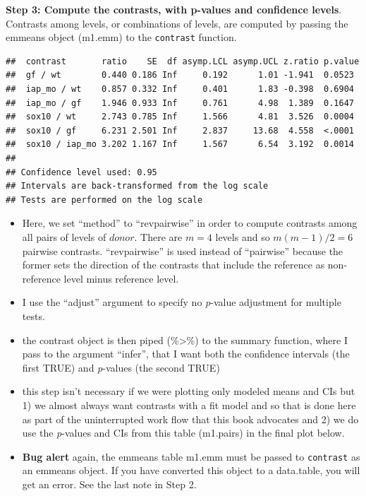 \documentclass[]{book}
\newenvironment{Shaded}{\begin{snugshade}}{\end{snugshade}}
\newcommand{\DataTypeTok}[1]{\textcolor[rgb]{0.13,0.29,0.53}{#1}}
\newcommand{\KeywordTok}[1]{\textcolor[rgb]{0.13,0.29,0.53}{\textbf{#1}}}
\newcommand{\NormalTok}[1]{#1}
\newcommand{\OperatorTok}[1]{\textcolor[rgb]{0.81,0.36,0.00}{\textbf{#1}}}
\newcommand{\OtherTok}[1]{\textcolor[rgb]{0.56,0.35,0.01}{#1}}
\newcommand{\StringTok}[1]{\textcolor[rgb]{0.31,0.60,0.02}{#1}}
\providecommand{\tightlist}{%
  \setlength{\itemsep}{0pt}\setlength{\parskip}{0pt}}
\begin{document}
\textbf{Step 3: Compute the contrasts, with p-values and confidence levels}. Contrasts among levels, or combinations of levels, are computed by passing the emmeans object (m1.emm) to the \texttt{contrast} function.

\begin{Shaded}
\end{Shaded}

\begin{verbatim}
##  contrast       ratio    SE  df asymp.LCL asymp.UCL z.ratio p.value
##  gf / wt        0.440 0.186 Inf     0.192      1.01 -1.941  0.0523 
##  iap_mo / wt    0.857 0.332 Inf     0.401      1.83 -0.398  0.6904 
##  iap_mo / gf    1.946 0.933 Inf     0.761      4.98  1.389  0.1647 
##  sox10 / wt     2.743 0.785 Inf     1.566      4.81  3.526  0.0004 
##  sox10 / gf     6.231 2.501 Inf     2.837     13.68  4.558  <.0001 
##  sox10 / iap_mo 3.202 1.167 Inf     1.567      6.54  3.192  0.0014 
## 
## Confidence level used: 0.95 
## Intervals are back-transformed from the log scale 
## Tests are performed on the log scale
\end{verbatim}

\begin{itemize}
\tightlist
\item
  Here, we set ``method'' to ``revpairwise'' in order to compute contrasts among all pairs of levels of \(donor\). There are \(m = 4\) levels and so \(m(m-1)/2 = 6\) pairwise contrasts. ``revpairwise'' is used instead of ``pairwise'' because the former sets the direction of the contrasts that include the reference as non-reference level minus reference level.
\item
  I use the ``adjust'' argument to specify no \emph{p}-value adjustment for multiple tests.
\item
  the contrast object is then piped (\%\textgreater\%) to the summary function, where I pass to the argument ``infer'', that I want both the confidence intervals (the first TRUE) and \emph{p}-values (the second TRUE)
\item
  this step isn't necessary if we were plotting only modeled means and CIs but 1) we almost always want contrasts with a fit model and so that is done here as part of the uninterrupted work flow that this book advocates and 2) we do use the \emph{p}-values and CIs from this table (m1.pairs) in the final plot below.
\item
  \textbf{Bug alert} again, the emmeans table m1.emm must be passed to \texttt{contrast} as an emmeans object. If you have converted this object to a data.table, you will get an error. See the last note in Step 2.
\end{itemize}
\end{document}
